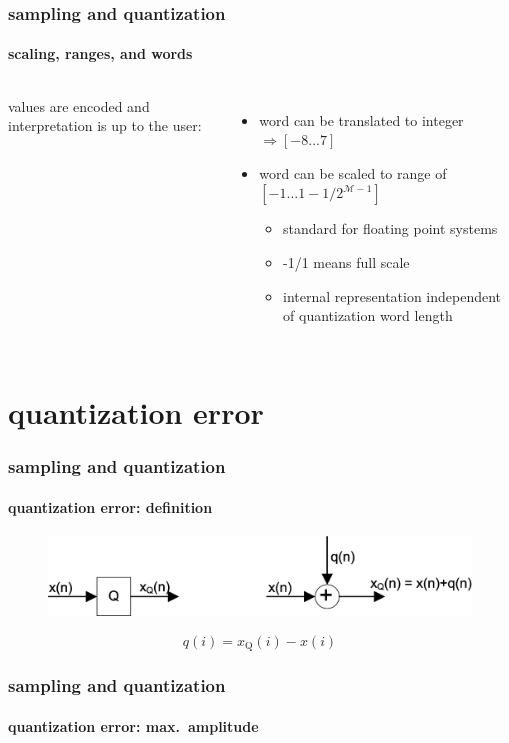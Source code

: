 	\begin{frame}\frametitle{sampling and quantization}\framesubtitle{scaling, ranges, and words}
        \begin{columns}
        values are encoded and interpretation is up to the user:
        \begin{itemize}
            \item   word can be translated to integer $\Rightarrow [-8...7]$
            \item   word can be scaled to range of $[-1...1-1/2^{\mathcal{M}-1}]$
                \begin{itemize}
                    \item   standard for floating point systems
                    \item   -1/1 means full scale
                    \item   internal representation independent of quantization word length
                \end{itemize}
        \end{itemize}
        \end{columns}
	\end{frame}

\section[error]{quantization error}
	\begin{frame}\frametitle{sampling and quantization}\framesubtitle{quantization error: definition}
		\begin{figure}
			\centering
			 \includegraphics[scale=0.13]{Graph/Flowchart_Quantization}
		\end{figure}
		\begin{equation*}
			q(i) = x_{\mathrm{Q}}(i) - x(i)
		\end{equation*}
	\end{frame}		
	\begin{frame}\frametitle{sampling and quantization}\framesubtitle{quantization error: max.\ amplitude}
        \begin{columns}
        \end{columns}
	\end{frame}		

